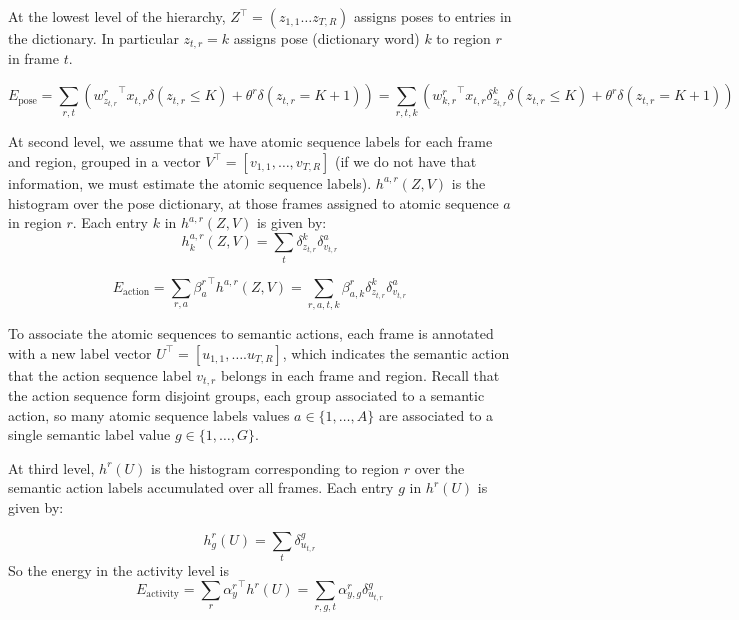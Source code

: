 \documentclass[10pt,letterpaper]{article}
\newcommand{\+}[1]{\ensuremath{{\boldsymbol #1}}}
\begin{document}
At the lowest level of the hierarchy, $Z^\top = (z_{1,1} \dots
z_{T,R})$ assigns poses to entries in the
dictionary. In particular $z_{t,r}=k$ assigns pose (dictionary word) $k$ to
region $r$ in frame $t$. 

\begin{equation}
E_{\text{pose}} = \sum_{r,t} ({w^r_{z_{t,r}}}^\top x_{t,r}\delta(z_{t,r}\le K) + \theta^r\delta(z_{t,r}=K+1))= \sum_{r,t,k} ({w^r_{k,r}}^\top x_{t,r} \delta_{z_{t,r}}^k\delta(z_{t,r} \le K)+\theta^r\delta(z_{t,r}=K+1)) 
\end{equation}



At second level, we assume that we have atomic sequence labels for each frame and region, grouped in a vector $V^\top = [v_{1,1},\dots,v_{T,R}]$  (if we do not have that information, we must estimate the atomic sequence labels).
$h^{a,r}(Z, V)$ is the histogram over the pose
dictionary, at those frames assigned to atomic sequence $a$ in region $r$.
Each entry $k$ in
$h^{a,r}(Z,V)$ is given by:
\begin{equation}
\label{eq:histogram_poses_actions}
h_{k}^{a,r}(Z, V) =  \sum_{t} \delta_{z_{t,r}}^k \delta_{v_{t,r}}^a
\end{equation}

\begin{equation}
E_{\text{action}} = \sum_{r,a} {\beta^r_{a}}^\top h^{a,r}(Z, V) = \sum_{r,a,t,k} \beta^r_{a,k} \delta_{z_{t,r}}^k \delta_{v_{t,r}}^a
\end{equation}

To associate the atomic sequences to semantic actions, each frame is annotated with a new label vector $U^\top = [u_{1,1},\dots.u_{T,R}]$, which indicates the semantic action that the action sequence label $v_{t,r}$ belongs in each frame and region. Recall that  the action sequence form disjoint groups, each group associated to a semantic action, so many atomic sequence labels values $a \in \{1,\dots,A\}$ are associated to a single semantic label value $g \in \{1,\dots,G\}$.
\vspace{1em}

At third level, $h^{r}(U)$ is the histogram corresponding to region $r$ over
the semantic action labels accumulated over all frames. Each entry $g$ in $h^{r}(U)$ is
given by:

\begin{equation}
h_g^{r}(U) = \sum_{t} \delta_{u_{t,r}}^g
\end{equation}
So the energy in the activity level is
\begin{equation}
E_{\text{activity}} = \sum_{r} {\alpha^r_{y}}^\top h^{r}(U) = \sum_{r,g,t}  \alpha^r_{y,g} \delta_{u_{t,r}}^g
\end{equation}
\end{document}
